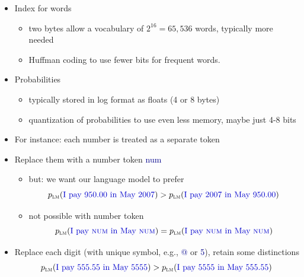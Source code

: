 \documentclass[landscape]{slides}
\newcommand{\example}[1]{\textcolor{darkblue}{\rm #1}}
\newcommand{\maths}[1]{\textcolor{purple}{#1}}
\begin{document}
\vspace{20mm}
\begin{itemize}
\item Index for words
\begin{itemize}
\item two bytes allow a vocabulary of $2^{16}=65,536$ words, typically more needed
\item Huffman coding to use fewer bits for frequent words.
\end{itemize}
\item Probabilities
\begin{itemize}
\item typically stored in log format as floats (4 or 8 bytes)
\item quantization of probabilities to use even less memory, maybe just 4-8 bits
\end{itemize}
\end{itemize}


\vspace{5mm}
\begin{itemize}
\item For instance: each number is treated as a separate token
\item Replace them with a number token \example{\sc num}
\begin{itemize}
\item but: we want our language model to prefer
\vspace{-5mm}
\maths{\begin{equation*}
p_\text{\sc lm}(\text{\example{I pay 950.00 in May 2007}}) > p_\text{\sc lm}(\text{\example{I pay 2007 in May 950.00}})
\end{equation*}}
\vspace{-12mm}
\item not possible with number token
\vspace{-5mm}
\maths{\begin{equation*}
p_\text{\sc lm}(\text{\example{I pay {\sc num} in May {\sc num}}}) = p_\text{\sc lm}(\text{\example{I pay {\sc num} in May {\sc num}}})
\end{equation*}}
\vspace{-17mm}
\end{itemize}
\item Replace each digit (with unique symbol, e.g., \example{@} or \example{5}), retain some distinctions
\vspace{-5mm}
\maths{\begin{equation*}
p_\text{\sc lm}(\text{\example{I pay 555.55 in May 5555}}) > p_\text{\sc lm}(\text{\example{I pay 5555 in May 555.55}})\vspace{-12mm}
\end{equation*}}
\end{itemize}
\end{document}

